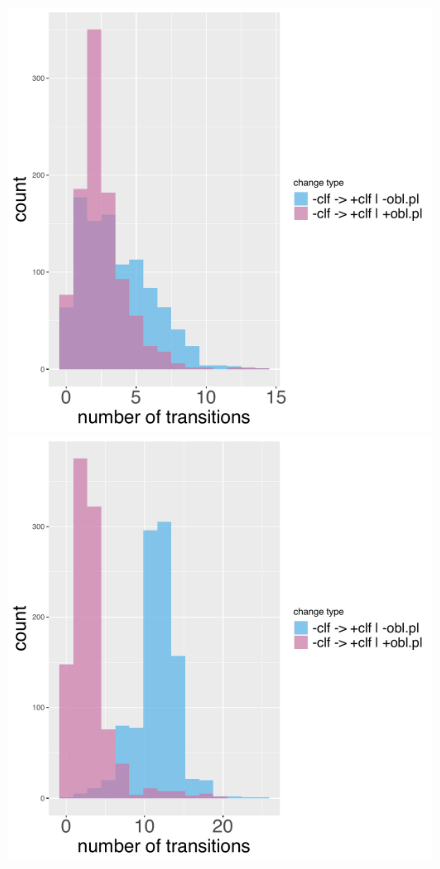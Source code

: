 \documentclass[11pt]{article}
\begin{document}
\begin{figure}[t!]
%
\begin{minipage}[t]{.45\linewidth}
\includegraphics[width=\linewidth]{code/ia_transitions.pdf}
\end{minipage}
\hspace{.05\linewidth}
\begin{minipage}[t]{.45\linewidth}
\includegraphics[width=\linewidth]{code/iran_transitions.pdf}

\end{minipage}
\end{figure}
\end{document}
